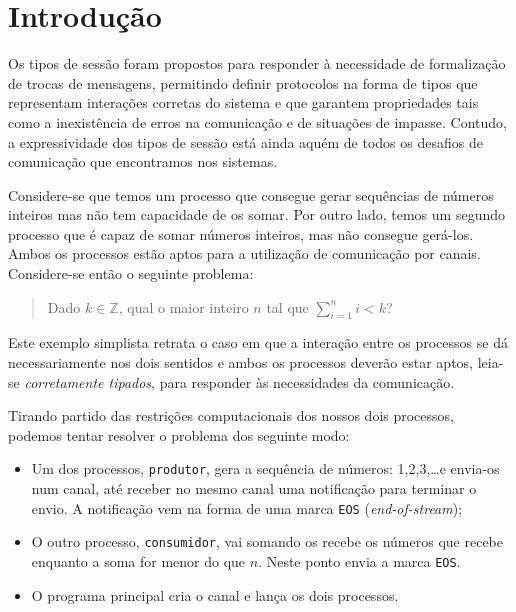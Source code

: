 \section{Introdução}

Os tipos de sessão foram propostos para responder à necessidade
de formalização de trocas de mensagens, permitindo definir protocolos 
na forma de tipos que representam interações corretas do sistema e que 
garantem propriedades tais como a inexistência de erros na comunicação 
e de situações de impasse. Contudo, a expressividade dos tipos de sessão
está ainda aquém de todos os desafios de comunicação que encontramos nos 
sistemas.

Considere-se que temos um processo que consegue gerar sequências de números
inteiros mas não tem capacidade de os somar. Por outro lado, temos um
segundo processo que é capaz de somar números inteiros, mas não consegue
gerá-los. Ambos os processos estão aptos para a utilização de comunicação
por canais. Considere-se então o seguinte problema:

\begin{quote}
	Dado $k\in\mathbb{Z}$, qual o maior inteiro $n$ tal que
	$\sum_{i=1}^n i < k$?
\end{quote}

Este exemplo simplista retrata o caso em que a interação entre
os processos se dá necessariamente nos dois sentidos e ambos 
os processos deverão
estar aptos, leia-se \emph{corretamente tipados}, para responder 
às necessidades da comunicação.


Tirando partido das restrições computacionais dos nossos dois
processos, podemos tentar resolver o problema dos seguinte modo:
%
\begin{itemize}
\item Um dos processos, \lstinline|produtor|, gera a sequência de
  números: 1,2,3,\dots e envia-os num canal, até receber no mesmo
  canal uma notificação para terminar o envio. A notificação vem na
  forma de uma marca \lstinline|EOS| (\textit{end-of-stream});
\item O outro processo, \lstinline|consumidor|, vai somando os recebe
  os números que recebe enquanto a soma for menor do que $n$. Neste
  ponto envia a marca \lstinline|EOS|.
\item O programa principal cria o canal e lança os dois processos.
\end{itemize}

